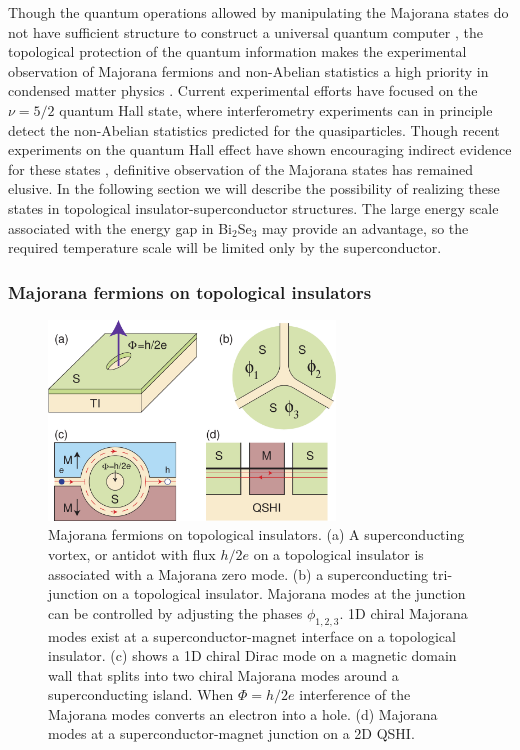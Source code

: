 \documentclass[twocolumn,floatfix,showpacs,rmp,aps]{revtex4}
\begin{document}
	Though the quantum operations allowed by manipulating the Majorana states
	do not have sufficient structure to construct a universal quantum
	computer \cite{freedman02}, the topological protection of the quantum information
	makes the experimental observation of Majorana fermions and non-Abelian
	statistics a high priority in condensed matter
	physics \cite{nayak08}.   Current experimental efforts have focused on the
	$\nu=5/2$ quantum Hall state, where interferometry experiments \cite{sternhalperin06,dassarma05}  can
	in principle detect the non-Abelian statistics predicted for the quasiparticles.
	Though recent experiments on the quantum Hall effect
	have shown encouraging indirect evidence for these states \cite{dolev08,radu08,willett09},
	definitive observation of the Majorana states has remained elusive.
	In the following section we will describe the possibility of
	realizing these states in topological insulator-superconductor
	structures.   The large energy scale associated with the energy gap
	in Bi$_2$Se$_3$ may provide an advantage, so the required temperature
	scale will be limited only by the superconductor.
	
	\subsubsection{Majorana fermions on topological insulators}
	\label{sec:majoranaontopo}
	
	\begin{figure}
		\includegraphics[width=3in]{Fig20}
		\caption{Majorana fermions on topological insulators.  (a) A superconducting vortex, or antidot
			with flux $h/2e$ on a topological insulator is associated with a Majorana zero mode.  (b)
			a superconducting tri-junction on a topological insulator.  Majorana modes
			at the junction can be controlled by adjusting the phases $\phi_{1,2,3}$.  1D chiral
			Majorana modes exist at a superconductor-magnet interface on a topological
			insulator. (c)
			shows a 1D chiral Dirac mode on a magnetic domain wall
			that splits into two chiral Majorana modes around a superconducting island.
			When $\Phi = h/2e$ interference of the Majorana modes converts an electron
			into a hole.  (d) Majorana modes at a superconductor-magnet junction on a 2D QSHI.
		}
		\label{fig:majorana}
	\end{figure}
	
\end{document}
